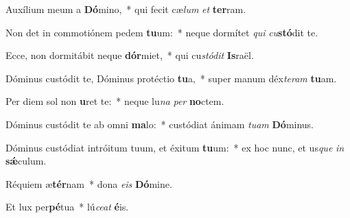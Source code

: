 ﻿\item Auxílium meum a \textbf{Dó}mino,~* qui fecit cæ\textit{lum} \textit{et} \textbf{ter}ram.
\item Non det in commotiónem pedem \textbf{tu}um:~* neque dormítet \textit{qui} \textit{cu}\textbf{stó}dit te.
\item Ecce, non dormitábit neque \textbf{dór}miet,~* qui cu\textit{stó}\textit{dit} \textbf{Is}raël.
\item Dóminus custódit te, Dóminus protéctio \textbf{tu}a,~* super manum déx\textit{te}\textit{ram} \textbf{tu}am.
\item Per diem sol non \textbf{u}ret te:~* neque lu\textit{na} \textit{per} \textbf{no}ctem.
\item Dóminus custódit te ab omni \textbf{ma}lo:~* custódiat ánimam \textit{tu}\textit{am} \textbf{Dó}minus.
\item Dóminus custódiat intróitum tuum, et éxitum \textbf{tu}um:~* ex hoc nunc, et us\textit{que} \textit{in} \textbf{sǽ}culum.
\item Réquiem æ\textbf{tér}nam~* dona \textit{e}\textit{is} \textbf{Dó}mine.
\item Et lux per\textbf{pé}tua~* lú\textit{ce}\textit{at} \textbf{é}is.